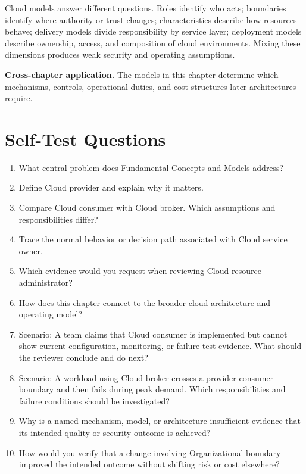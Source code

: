 \documentclass[11pt]{article}
\begin{document}
\begin{synthesisbox}
Cloud models answer different questions. Roles identify who acts; boundaries identify where authority or trust changes; characteristics describe how resources behave; delivery models divide responsibility by service layer; deployment models describe ownership, access, and composition of cloud environments. Mixing these dimensions produces weak security and operating assumptions.
\par\smallskip
\textbf{Cross-chapter application.} The models in this chapter determine which mechanisms, controls, operational duties, and cost structures later architectures require.
\end{synthesisbox}
\section{Self-Test Questions}
\begin{enumerate}
\item What central problem does Fundamental Concepts and Models address?
\item Define Cloud provider and explain why it matters.
\item Compare Cloud consumer with Cloud broker. Which assumptions and responsibilities differ?
\item Trace the normal behavior or decision path associated with Cloud service owner.
\item Which evidence would you request when reviewing Cloud resource administrator?
\item How does this chapter connect to the broader cloud architecture and operating model?
\item Scenario: A team claims that Cloud consumer is implemented but cannot show current configuration, monitoring, or failure-test evidence. What should the reviewer conclude and do next?
\item Scenario: A workload using Cloud broker crosses a provider-consumer boundary and then fails during peak demand. Which responsibilities and failure conditions should be investigated?
\item Why is a named mechanism, model, or architecture insufficient evidence that its intended quality or security outcome is achieved?
\item How would you verify that a change involving Organizational boundary improved the intended outcome without shifting risk or cost elsewhere?
\end{enumerate}
\clearpage
\end{document}
